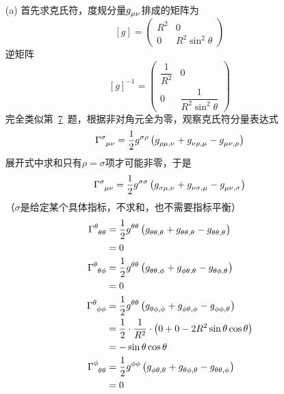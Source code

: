 \begin{xiti}
    \begin{jie}
    	\begin{enumerate}
    		\item[(a)] 首先求克氏符，度规分量$\tensor{g}{_\mu_\nu}$排成的矩阵为
    		\begin{displaymath}
    		\left[g\right]=\left(
    		\begin{array}{cc}
    		R^2&0\\
    		0&R^2 \sin^2\theta
    		\end{array}
    		\right)
    		\end{displaymath}
    		逆矩阵
    		\begin{displaymath}
    		\left[g\right]^{-1}=\left(
    		\begin{array}{cc}
    		\dfrac{1}{R^2}&0\\
    		0&\dfrac{1}{R^2 \sin^2\theta}
    		\end{array}
    		\right)
    		\end{displaymath}
    		完全类似第~\hyperlink{3.7}{7}~题，根据非对角元全为零，观察克氏符分量表达式
    		\begin{displaymath}
    		\ChristoffelSymbol{\sigma}{\mu}{\nu}=\christoffelSymbol{\sigma}{\mu}{\nu}{\rho}
    		\end{displaymath}
    		展开式中求和只有$\rho=\sigma$项才可能非零，于是
    		\begin{displaymath}
    		\ChristoffelSymbol{\sigma}{\mu}{\nu}=\christoffelSymbol{\sigma}{\mu}{\nu}{\sigma}
    		\end{displaymath}
    		（$\sigma$是给定某个具体指标，不求和，也不需要指标平衡）
    		\begin{align*}
    		\ChristoffelSymbol{\theta}{\theta}{\theta}&= \christoffelSymbol{\theta}{\theta}{\theta}{\theta}\\
    		&=0\\
    		\ChristoffelSymbol{\theta}{\theta}{\phi}&= \christoffelSymbol{\theta}{\theta}{\phi}{\theta}\\
    		&=0\\
    		\ChristoffelSymbol{\theta}{\phi}{\phi}&= \christoffelSymbol{\theta}{\phi}{\phi}{\theta}\\
    		&=\frac{1}{2}\cdot \frac{1}{R^2} \cdot \left( 0+0-2 R^2 \sin \theta \cos \theta \right)\\
    		&=-\sin\theta\cos\theta\\
    		\ChristoffelSymbol{\phi}{\theta}{\theta}&= \christoffelSymbol{\phi}{\theta}{\theta}{\phi}\\
    		&=0\\

\end{align*}
\end{enumerate}
\end{jie}
\end{xiti}
